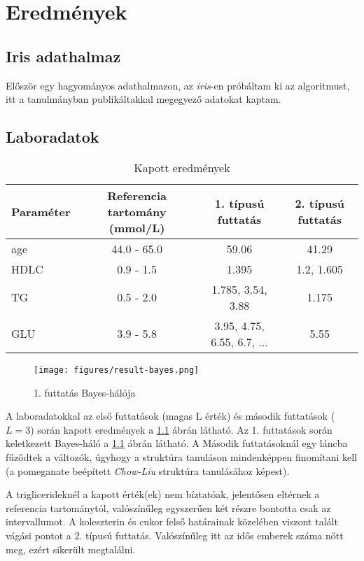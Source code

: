 \chapter{Eredmények}

\section{Iris adathalmaz}
Először egy hagyományos adathalmazon, az \emph{iris}-en próbáltam ki az algoritmust, itt a tanulmányban publikáltakkal megegyező adatokat kaptam.

\section{Laboradatok}
\begin{table}[]
\begin{tabular}{lccc}
Paraméter & Referencia tartomány (mmol/L) & 1. típusú futtatás & 2. típusú futtatás \\
\hline
age  & 44.0 - 65.0 & 59.06                         & 41.29\\
HDLC & 0.9 - 1.5   & 1.395                         & 1.2, 1.605\\
TG  & 0.5 - 2.0   & 1.785, 3.54, 3.88             & 1.175\\
GLU   & 3.9 - 5.8   & 3.95, 4.75, 6.55, 6.7, $\dotsc$ & 5.55
\end{tabular}
\caption{Kapott eredmények}
\label{tab:eredmenyek}
\end{table}

\begin{figure}[htp]
    \centering
    \texttt{[image: figures/result-bayes.png]}
    \caption{1. futtatás Bayes-hálója}
    \label{fig:result-bayes}
\end{figure}

A laboradatokkal az első futtatások (magas L érték) és második futtatások ($L = 3$) során kapott eredmények a \ref{tab:eredmenyek} ábrán látható. Az 1. futtatások során keletkezett Bayes-háló a \ref{fig:result-bayes} ábrán látható. A Második futtatásoknál egy láncba fűződtek a változók, úgyhogy a struktúra tanuláson mindenképpen finomítani kell (a pomeganate beépített \emph{Chow-Liu} struktúra tanulásához képest).

A triglicerideknél a kapott érték(ek) nem bíztatóak, jelentősen eltérnek a referencia tartománytól, valószínűleg egyszerűen két részre bontotta csak az intervallumot. A koleszterin és cukor felső határainak közelében viszont talált vágási pontot a 2. típusú futtatás. Valószínűleg itt az idős emberek száma nőtt meg, ezért sikerült megtalálni.

